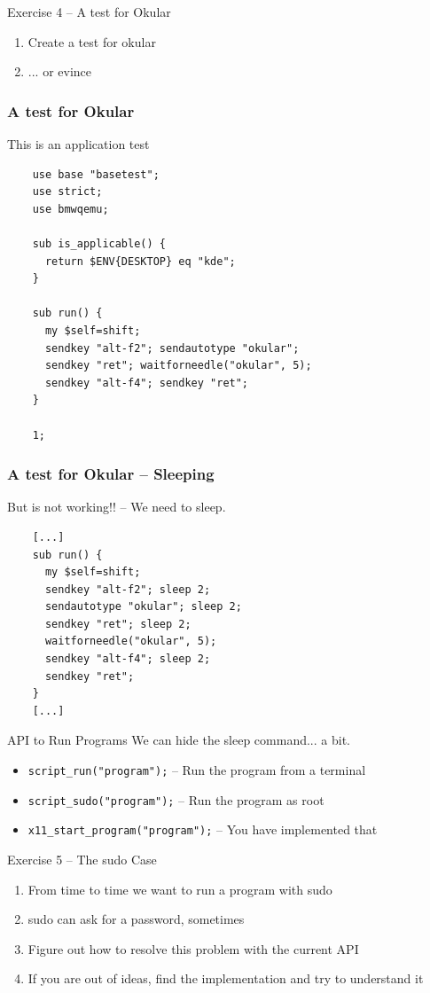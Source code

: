 \documentclass{beamer}
\begin{document}
%
%
\begin{frame}{Exercise 4 -- A test for Okular}
  \begin{enumerate}
  \item Create a test for okular
  \item ... or evince 
  \end{enumerate}
\end{frame}


\begin{frame}[fragile]
  \frametitle{A test for Okular}
  This is an application test
  \lstset{style=myperl}
  \begin{lstlisting}
    use base "basetest";
    use strict;
    use bmwqemu;

    sub is_applicable() {
      return $ENV{DESKTOP} eq "kde";
    }

    sub run() {
      my $self=shift;
      sendkey "alt-f2"; sendautotype "okular";
      sendkey "ret"; waitforneedle("okular", 5);
      sendkey "alt-f4"; sendkey "ret";
    }

    1;
  \end{lstlisting}
\end{frame}

\begin{frame}[fragile]
  \frametitle{A test for Okular -- Sleeping}
  But is not working!! -- We need to sleep.
  \lstset{style=myperl}
  \begin{lstlisting}
    [...]
    sub run() {
      my $self=shift;
      sendkey "alt-f2"; sleep 2;
      sendautotype "okular"; sleep 2;
      sendkey "ret"; sleep 2;
      waitforneedle("okular", 5);
      sendkey "alt-f4"; sleep 2;
      sendkey "ret";
    }
    [...]
  \end{lstlisting}
\end{frame}

\begin{frame}{API to Run Programs}
  We can hide the sleep command... a bit.
  \begin{itemize}
  \item \texttt{script\_run("program");} -- Run the program from a terminal
  \item \texttt{script\_sudo("program");} -- Run the program as root
  \item \texttt{x11\_start\_program("program");} -- You have implemented that
  \end{itemize}
\end{frame}

%
%
\begin{frame}{Exercise 5 -- The sudo Case}
  \begin{enumerate}
  \item From time to time we want to run a program with sudo
  \item sudo can ask for a password, sometimes
  \item Figure out how to resolve this problem with the current API
  \item If you are out of ideas, find the implementation and try to understand it
  \end{enumerate}
\end{frame}
\end{document}
